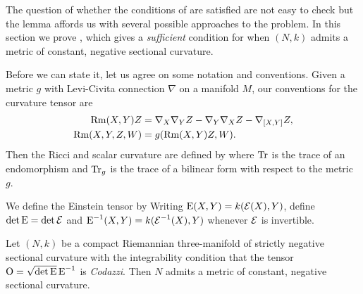 \documentclass[a4paper,12pt]{amsart}
\begin{document}

The question of whether the conditions of  are satisfied are not easy to check but the lemma affords us with several possible approaches to the problem. In this section we prove  , which gives a \emph{sufficient} condition for when \((N, k)\) admits a metric of constant, negative sectional curvature.

Before we can state it, let us agree on some notation and conventions.
Given a metric \(g\) with Levi-Civita connection $\nabla$ on a manifold $M$, our conventions for the curvature tensor are
\[
\begin{split}
\operatorname{Rm}(X, Y) Z &= \nabla_X \nabla_Y Z - \nabla_Y \nabla_X Z - \nabla_{[X, Y]} Z, \\
\operatorname{Rm}(X, Y, Z, W) &= g(\operatorname{Rm}(X, Y) Z, W).
\end{split}
\]
Then the Ricci and scalar curvature are defined by
where $\operatorname{Tr}$ is the trace of an endomorphism and $\operatorname{Tr}_{g}$ is the trace of a bilinear form with respect to the metric $g$.

We define the Einstein tensor by
 Writing \(\operatorname{E}(X, Y) = k(\operatorname{\mathcal{E}}(X), Y)\), define \(\det \operatorname{E} = \det \operatorname{\mathcal{E}}\) and \(\operatorname{E}^{-1}(X, Y) = k(\operatorname{\mathcal{E}}^{-1} (X), Y)\) whenever \(\operatorname{\mathcal{E}}\) is invertible. 

\begin{thm}
\label{thm:intg_const_curv}

Let \((N, k)\) be a compact Riemannian three-manifold of strictly negative sectional curvature with the integrability condition that the tensor \(\operatorname{O} = \sqrt{\det \operatorname{E}} \operatorname{E}^{-1}\) is \emph{Codazzi}. Then \(N\) admits a metric of constant, negative sectional curvature.
\end{thm}
\end{document}

